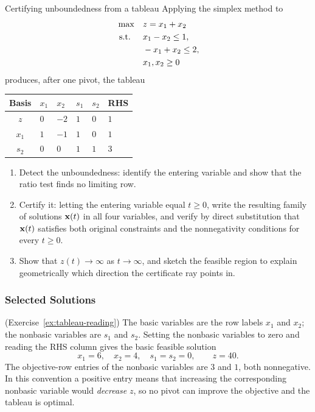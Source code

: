 \begin{ex}{Certifying unboundedness from a tableau}{}
\label{ex:tableau-unbounded-certificate}
 Applying the simplex method to
\[
\begin{aligned}
\max\quad & z = x_1 + x_2\\
\mbox{ s.t. }\quad  & x_1 - x_2  \le 1,\\
          & -x_1 + x_2 \le 2,\\
          & x_1, x_2 \ge 0
\end{aligned}
\]
produces, after one pivot, the tableau
\begin{center}
\renewcommand{\arraystretch}{1.3}
\begin{tabular}{c|ZZZZ|Z}
\toprule
Basis & $x_1$ & $x_2$ & $s_1$ & $s_2$ & RHS\\
\midrule
$z$   & $0$ & $-2$ & $1$ & $0$ & $1$\\
\midrule
$x_1$ & $1$ & $-1$ & $1$ & $0$ & $1$\\
$s_2$ & $0$ & $0$  & $1$ & $1$ & $3$\\
\bottomrule
\end{tabular}
\end{center}
\begin{enumerate}
    \item Detect the unboundedness: identify the entering variable and show that the ratio test finds no limiting row.
    \item Certify it: letting the entering variable equal $t \ge 0$, write the resulting family of solutions $\mathbf{x}(t)$ in all four variables, and verify by direct substitution that $\mathbf{x}(t)$ satisfies both original constraints and the nonnegativity conditions for every $t \ge 0$.
    \item Show that $z(t) \to \infty$ as $t \to \infty$, and sketch the feasible region to explain geometrically which direction the certificate ray points in.
\end{enumerate}
\end{ex}

\subsubsection*{Selected Solutions}

\begin{solution}(Exercise~\ref{ex:tableau-reading})
The basic variables are the row labels $x_1$ and $x_2$; the nonbasic variables are $s_1$ and $s_2$.  Setting the nonbasic variables to zero and reading the RHS column gives the basic feasible solution
\[
x_1 = 6, \quad x_2 = 4, \quad s_1 = s_2 = 0, \qquad z = 40.
\]
The objective-row entries of the nonbasic variables are $3$ and $1$, both nonnegative.  In this convention a positive entry means that increasing the corresponding nonbasic variable would \emph{decrease} $z$, so no pivot can improve the objective and the tableau is optimal.
\end{solution}

